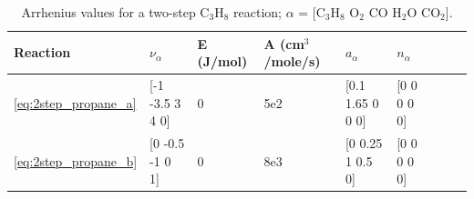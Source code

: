 \documentclass[11pt]{book}
\begin{document}
\begin{table}[ht]
\begin{center}
\caption[Arrhenius values for a two-step C$_3$H$_8$ reaction]{Arrhenius values for a two-step C$_3$H$_8$ reaction; $\alpha$ = [$\mathrm{C_3H_8}$ $\mathrm{O_2}$ $\mathrm{CO}$ $\mathrm{H_2O}$ $\mathrm{CO_2}$].}
\label{two_step_c3h8}
\begin{tabular}{|l|l|l|l|l|l|l|l|l|}
\hline Reaction & $\nu_{\alpha}$ & E (J/mol) & A (cm$^3$/mole/s) & $a_{\alpha}$ & $n_{\alpha}$  \\ \hline \hline
\ref{eq:2step_propane_a} & [-1 -3.5 3 4 0] & 0 & 5e2 & [0.1 1.65 0 0 0] & [0 0 0 0 0] \\ \hline
\ref{eq:2step_propane_b} & [0 -0.5 -1 0 1] & 0 & 8e3 & [0 0.25 1 0.5 0] & [0 0 0 0 0] \\ \hline
\end{tabular}
\end{center}
\end{table}
\end{document}
